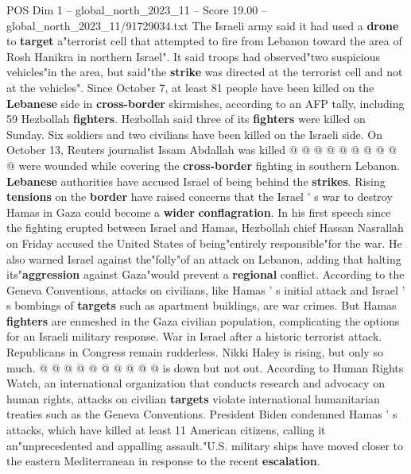 \begin{textsample}{POS Dim 1 – global\_north\_2023\_11 – Score 19.00 – global\_north\_2023\_11/91729034.txt}
The Israeli army said it had used a \textbf{drone} to \textbf{target} a"terrorist cell that attempted to fire from Lebanon toward the area of Rosh Hanikra in northern Israel".
It said troops had observed"two suspicious vehicles"in the area, but said"the \textbf{strike} was directed at the terrorist cell and not at the vehicles".
Since October 7, at least 81 people have been killed on the \textbf{Lebanese} side in \textbf{cross-border} skirmishes, according to an AFP tally, including 59 Hezbollah \textbf{fighters}.
Hezbollah said three of its \textbf{fighters} were killed on Sunday.
Six soldiers and two civilians have been killed on the Israeli side.
On October 13, Reuters journalist Issam Abdallah was killed @ @ @ @ @ @ @ @ @ @ were wounded while covering the \textbf{cross-border} fighting in southern Lebanon. \textbf{Lebanese} authorities have accused Israel of being behind the \textbf{strikes}.
Rising \textbf{tensions} on the \textbf{border} have raised concerns that the Israel ' s war to destroy Hamas in Gaza could become a \textbf{wider} \textbf{conflagration}.
In his first speech since the fighting erupted between Israel and Hamas, Hezbollah chief Hassan Nasrallah on Friday accused the United States of being"entirely responsible"for the war.
He also warned Israel against the"folly"of an attack on Lebanon, adding that halting its"\textbf{aggression} against Gaza"would prevent a \textbf{regional} conflict.
According to the Geneva Conventions, attacks on civilians, like Hamas ' s initial attack and Israel ' s bombings of \textbf{targets} such as apartment buildings, are war crimes.
But Hamas \textbf{fighters} are enmeshed in the Gaza civilian population, complicating the options for an Israeli military response.
War in Israel after a historic terrorist attack.
Republicans in Congress remain rudderless.
Nikki Haley is rising, but only so much. @ @ @ @ @ @ @ @ @ @ is down but not out.
According to Human Rights Watch, an international organization that conducts research and advocacy on human rights, attacks on civilian \textbf{targets} violate international humanitarian treaties such as the Geneva Conventions.
President Biden condemned Hamas ' s attacks, which have killed at least 11 American citizens, calling it an"unprecedented and appalling assault."U.S. military ships have moved closer to the eastern Mediterranean in response to the recent \textbf{escalation}.

\end{textsample}
